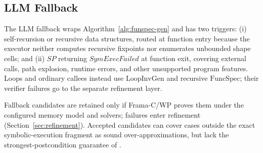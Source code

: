\subsection{LLM Fallback}
\label{sec:llm-fallback}

The LLM fallback wraps Algorithm~\ref{alg:funspec-gen} and has two triggers: (i) self-recursion or recursive data structures, routed at function entry because the executor neither computes recursive fixpoints nor enumerates unbounded shape cells; and (ii) $\textit{SP}$ returning $\textit{SymExecFailed}$ at function exit, covering external calls, path explosion, runtime errors, and other unsupported program features. Loops and ordinary callees instead use $\mathrm{LoopInvGen}$ and recursive $\mathrm{FuncSpec}$; their verifier failures go to the separate refinement layer.


Fallback candidates are retained only if Frama-C/WP proves them under the configured memory model and solvers; failures enter refinement (Section~\ref{sec:refinement}). Accepted candidates can cover cases outside the exact symbolic-execution fragment as sound over-approximations, but lack the strongest-postcondition guarantee of .

